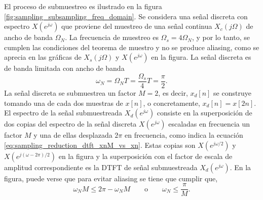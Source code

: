 \documentclass[a4paper]{report}
\begin{document}
El proceso de submuestreo es ilustrado en la figura \ref{fig:sampling_subsampling_freq_domain}. Se considera una señal discreta con espectro \(X(e^{j\omega})\) que proviene del muestreo de una señal continua \(X_c(j\Omega)\) de ancho de banda \(\Omega_N\). La frecuencia de muestreo es \(\Omega_s=4\Omega_N\), y por lo tanto, se cumplen las condiciones del teorema de muestro y no se produce aliasing, como se aprecia en las gráficas de \(X_s(j\Omega)\) y \(X(e^{j\omega})\) en la figura. La señal discreta es de banda limitada con ancho de banda
\[
 \omega_N=\Omega_NT=\frac{\Omega_s}{4}T=\frac{\pi}{2}.
\]
La señal discreta se submuestrea un factor \(M=2\), es decir, \(x_d[n]\) se construye tomando una de cada dos muestras de \(x[n]\), o concretamente, \(x_d[n]=x[2n]\). El espectro de la señal submuestreada \(X_d(e^{j\omega})\) consiste en la superposición de dos copias del espectro de la señal discreta \(X(e^{j\omega})\) escaladas en frecuencia un factor \(M\) y una de ellas desplazada \(2\pi\) en frecuencia, como indica la ecuación \ref{eq:sampling_reduction_dtft_xnM_vs_xn}. Estas copias son \(X(e^{j\omega/2})\) y \(X(e^{j(\omega-2\pi)/2})\) en la figura y la superposición con el factor de escala de amplitud correspondiente es la DTFT de señal submuestreada \(X_d(e^{j\omega})\). En la figura, puede verse que para evitar aliasing se tiene que cumplir que,
\[
\omega_N M\leq2\pi-\omega_N M
\qquad\textrm{o}\qquad
\omega_N\leq \frac{\pi}{M}.
\]
\end{document}
